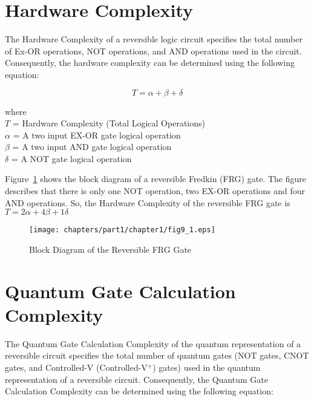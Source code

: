 
\section{Hardware Complexity}
The Hardware Complexity of a reversible logic circuit specifies the total number of Ex-OR operations, NOT operations, and AND operations used in the circuit. Consequently, the hardware complexity can be determined using the following equation:

\begin{equation}
T=\alpha+\beta+\delta
\end{equation}

\noindent where\\
$T$ = Hardware Complexity (Total Logical Operations)\\
$\alpha$ = A two input EX-OR gate logical operation \\
$\beta$ = A two input AND gate logical operation \\
$\delta$ = A NOT gate logical operation

\begin{example}\textnormal{
Figure~\ref{fig:p1_c1_fig9_1} shows the block diagram of a reversible Fredkin (FRG) gate. The figure describes that there is only one NOT operation, two EX-OR operations and four AND operations. So, the Hardware Complexity of the reversible FRG gate is $T= 2\alpha+4\beta+1\delta$}
\end{example}
\begin{figure}[H]
\centering
\texttt{[image: chapters/part1/chapter1/fig9\_1.eps]}
\caption{Block Diagram of the Reversible FRG Gate}
\label{fig:p1_c1_fig9_1}
\end{figure}

\section{Quantum Gate Calculation Complexity}
The Quantum Gate Calculation Complexity of the quantum representation of a reversible circuit specifies the total number of quantum gates (NOT gates, CNOT gates, and Controlled-V (Controlled-V$^+$) gates) used in the quantum representation of a reversible circuit. Consequently, the Quantum Gate Calculation Complexity can be determined using the following equation:


